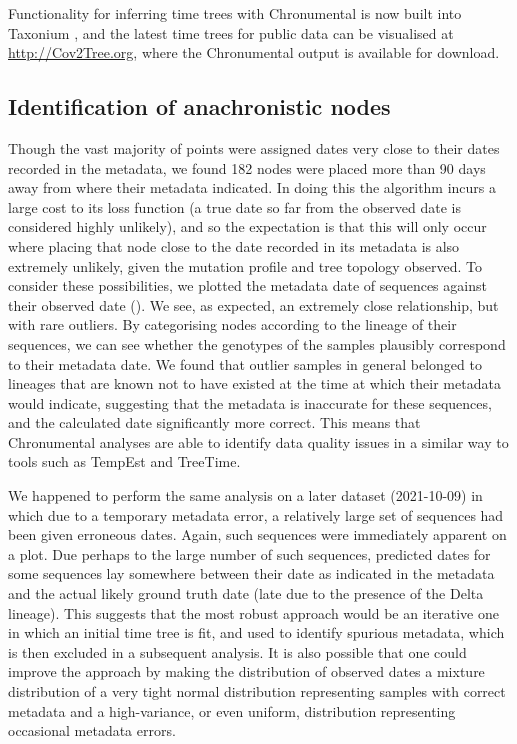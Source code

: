 Functionality for inferring time trees with Chronumental is now built into Taxonium \citep{taxonium}, and the latest time trees for public data can be visualised at \url{http://Cov2Tree.org}, where the Chronumental output is available for download.


\subsection*{Identification of anachronistic nodes}

Though the vast majority of points were assigned dates very close to their dates recorded in the metadata, we found 182 nodes were placed more than 90 days away from where their metadata indicated. In doing this the algorithm incurs a large cost to its loss function (a true date so far from the observed date is considered highly unlikely), and so the expectation is that this will only occur where placing that node close to the date recorded in its metadata is also extremely unlikely, given the mutation profile and tree topology observed. To consider these possibilities, we plotted the metadata date of sequences against their observed date (). We see, as expected, an extremely close relationship, but with rare outliers. By categorising nodes according to the lineage of their sequences, we can see whether the genotypes of the samples plausibly correspond to their metadata date. We found that outlier samples in general belonged to lineages that are known not to have existed at the time at which their metadata would indicate, suggesting that the metadata is inaccurate for these sequences, and the calculated date significantly more correct. This means that Chronumental analyses are able to identify data quality issues in a similar way to tools such as TempEst \citep{tempest} and TreeTime.

We happened to perform the same analysis on a later dataset (2021-10-09) in which due to a temporary metadata error, a relatively large set of sequences had been given erroneous dates. Again, such sequences were immediately apparent on a plot. Due perhaps to the large number of such sequences, predicted dates for some sequences lay somewhere between their date as indicated in the metadata and the actual likely ground truth date (late due to the presence of the Delta lineage). This suggests that the most robust approach would be an iterative one in which an initial time tree is fit, and used to identify  spurious metadata, which is then excluded in a subsequent analysis. It is also possible that one could improve the approach by making the distribution of observed dates a mixture distribution of a very tight normal distribution representing samples with correct metadata and a high-variance, or even uniform, distribution representing occasional metadata errors.

